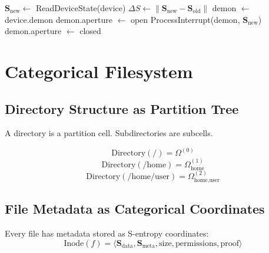 \documentclass[twocolumn,10pt]{article}
\theoremstyle{definition}
\theoremstyle{remark}
\newcommand{\Scoord}{\mathbf{S}}
\begin{document}
\begin{algorithm}
\caption{Handle Interrupt}
\begin{algorithmic}[1]
    \State $\Scoord_{\text{new}} \gets$ ReadDeviceState(device)
    \State $\Delta S \gets \|\Scoord_{\text{new}} - \Scoord_{\text{old}}\|$
        \State demon $\gets$ device.demon
        \State demon.aperture $\gets$ open
        \State ProcessInterrupt(demon, $\Scoord_{\text{new}}$)
        \State demon.aperture $\gets$ closed
    \EndIf
\EndFunction
\end{algorithmic}
\end{algorithm}

\section{Categorical Filesystem}
\label{sec:filesystem}

\subsection{Directory Structure as Partition Tree}

A directory is a partition cell. Subdirectories are subcells.

\begin{equation}
    \text{Directory}(/) = \Omega^{(0)}
\end{equation}
\begin{equation}
    \text{Directory}(/\text{home}) = \Omega^{(1)}_{\text{home}}
\end{equation}
\begin{equation}
    \text{Directory}(/\text{home/user}) = \Omega^{(2)}_{\text{home,user}}
\end{equation}

\subsection{File Metadata as Categorical Coordinates}

Every file has metadata stored as S-entropy coordinates:
\begin{equation}
    \text{Inode}(f) = \langle \Scoord_{\text{data}}, \Scoord_{\text{meta}}, \text{size}, \text{permissions}, \text{proof} \rangle
\end{equation}
\end{document}
